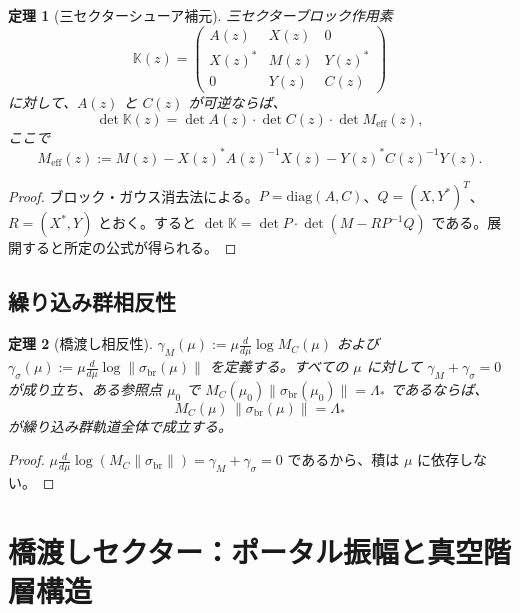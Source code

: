 \documentclass[12pt]{article}
\theoremstyle{plain}
\newtheorem{theorem}{定理}[section]
\theoremstyle{definition}
\numberwithin{equation}{section}
\newcommand{\br}{\mathrm{br}}
\begin{document}
\begin{theorem}[三セクターシューア補元]\label{thm:threesectorschur}
三セクターブロック作用素
\begin{equation}
\mathbb{K}(z) = \begin{pmatrix}
A(z) & X(z) & 0 \\
X(z)^* & M(z) & Y(z)^* \\
0 & Y(z) & C(z)
\end{pmatrix}
\end{equation}
に対して、$A(z)$ と $C(z)$ が可逆ならば、
\begin{equation}
\det\mathbb{K}(z) = \det A(z)\cdot\det C(z)\cdot\det M_{\mathrm{eff}}(z),
\end{equation}
ここで
\begin{equation}
M_{\mathrm{eff}}(z) := M(z) - X(z)^*A(z)^{-1}X(z) - Y(z)^*C(z)^{-1}Y(z).
\end{equation}
\end{theorem}

\begin{proof}
ブロック・ガウス消去法による。$P=\mathrm{diag}(A,C)$、$Q=(X,Y^*)^T$、$R=(X^*,Y)$ とおく。すると $\det\mathbb{K}=\det P\cdot\det(M-RP^{-1}Q)$ である。展開すると所定の公式が得られる。
\end{proof}

\subsection{繰り込み群相反性}

\begin{theorem}[橋渡し相反性]\label{thm:reciprocity}
$\gamma_M(\mu):=\mu\frac{d}{d\mu}\log M_C(\mu)$ および $\gamma_\sigma(\mu):=\mu\frac{d}{d\mu}\log\|\sigma_{\br}(\mu)\|$ を定義する。すべての $\mu$ に対して $\gamma_M+\gamma_\sigma=0$ が成り立ち、ある参照点 $\mu_0$ で $M_C(\mu_0)\|\sigma_{\br}(\mu_0)\|=\Lambda_*$ であるならば、
\begin{equation}
\boxed{M_C(\mu)\,\|\sigma_{\br}(\mu)\| = \Lambda_*}
\end{equation}
が繰り込み群軌道全体で成立する。
\end{theorem}

\begin{proof}
$\mu\frac{d}{d\mu}\log(M_C\|\sigma_{\br}\|)=\gamma_M+\gamma_\sigma=0$ であるから、積は $\mu$ に依存しない。
\end{proof}


\section{橋渡しセクター：ポータル振幅と真空階層構造}\label{sec:bridge}
\end{document}
